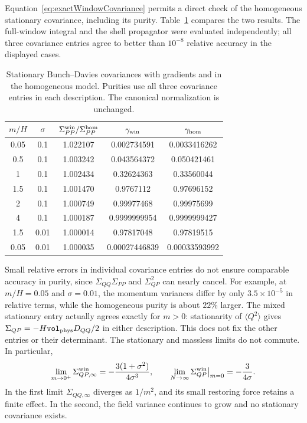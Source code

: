 \documentclass{article}
\newcommand{\Vphys}{\mathtt{vol}_{\rm phys}}
\numberwithin{equation}{section}
\begin{document}
Equation~\eqref{eq:exactWindowCovariance} permits a direct check of the homogeneous stationary covariance, including its purity. Table~\ref{tab:gradientComparison} compares the two results. The full-window integral and the shell propagator were evaluated independently; all three covariance entries agree to better than $10^{-8}$ relative accuracy in the displayed cases.
\begin{table}[ht]
\centering
\begin{tabular}{ccccc}
\hline
$m/H$ & $\sigma$ & $\Sigma_{PP}^{\rm win}/\Sigma_{PP}^{\rm hom}$ & $\gamma_{\rm win}$ & $\gamma_{\rm hom}$\\
\hline
0.05 & 0.1 & 1.022107 & 0.002734591 & 0.0033416262 \\
0.5 & 0.1 & 1.003242 & 0.043564372 & 0.050421461 \\
1 & 0.1 & 1.002434 & 0.32624363 & 0.33560044 \\
1.5 & 0.1 & 1.001470 & 0.9767112 & 0.97696152 \\
2 & 0.1 & 1.000749 & 0.99977468 & 0.99975699 \\
4 & 0.1 & 1.000187 & 0.9999999954 & 0.9999999427 \\
1.5 & 0.01 & 1.000014 & 0.97817048 & 0.97819515 \\
0.05 & 0.01 & 1.000035 & 0.00027446839 & 0.00033593992 \\
\hline
\end{tabular}
\caption{Stationary Bunch--Davies covariances with gradients and in the homogeneous model. Purities use all three covariance entries in each description. The canonical normalization is unchanged.}
\label{tab:gradientComparison}
\end{table}

Small relative errors in individual covariance entries do not ensure comparable accuracy in purity, since $\Sigma_{QQ}\Sigma_{PP}$ and $\Sigma_{QP}^2$ can nearly cancel. For example, at $m/H=0.05$ and $\sigma=0.01$, the momentum variances differ by only $3.5\times10^{-5}$ in relative terms, while the homogeneous purity is about $22\%$ larger. The mixed stationary entry actually agrees exactly for $m>0$: stationarity of $\langle Q^2\rangle$ gives $\Sigma_{QP}=-H\Vphys D_{QQ}/2$ in either description. This does not fix the other entries or their determinant. The stationary and massless limits do not commute. In particular,
\begin{equation}
 \lim_{m\to0^+}\Sigma_{QP,\infty}^{\rm win}
 =-\frac{3(1+\sigma^2)}{4\sigma^3},\qquad
 \lim_{N\to\infty}\Sigma_{QP}^{\rm win}\big|_{m=0}
 =-\frac{3}{4\sigma}.
 \label{eq:noncommutingMasslessLimits}
\end{equation}
In the first limit $\Sigma_{QQ,\infty}$ diverges as $1/m^2$, and its small restoring force retains a finite effect. In the second, the field variance continues to grow and no stationary covariance exists.
\end{document}

